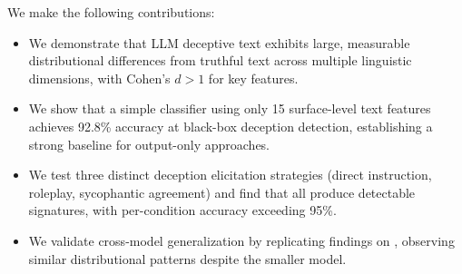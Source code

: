  We make the following contributions:
\begin{itemize}[leftmargin=*,itemsep=0pt,topsep=0pt]
    \item We demonstrate that LLM deceptive text exhibits large, measurable distributional differences from truthful text across multiple linguistic dimensions, with Cohen's $d > 1$ for key features.
    \item We show that a simple classifier using only 15 surface-level text features achieves 92.8\% accuracy at black-box deception detection, establishing a strong baseline for output-only approaches.
    \item We test three distinct deception elicitation strategies (direct instruction, roleplay, sycophantic agreement) and find that all produce detectable signatures, with per-condition accuracy exceeding 95\%.
    \item We validate cross-model generalization by replicating findings on \gptmini, observing similar distributional patterns despite the smaller model.
\end{itemize}
